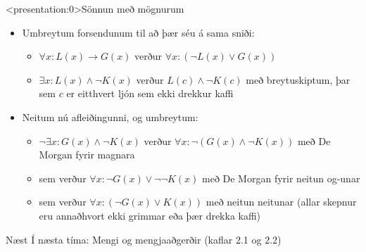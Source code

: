 \documentclass{beamer}
\begin{document}
\begin{frame}<presentation:0>{Sönnun með mögnurum}
\begin{itemize}
 \item Umbreytum forsendunum til að þær séu á sama sniði:
 \begin{itemize}
  \item $\forall x: L(x) \to G(x)$ verður $ \forall x:(\lnot L(x) \lor G(x))$
  \item $\exists x: L(x) \land \lnot K(x)$ verður $L(c) \land \lnot K(c)$ með breytuskiptum, þar sem $c$ er eitthvert ljón sem ekki drekkur kaffi
 \end{itemize}
 \item Neitum nú afleiðingunni, og umbreytum:
 \begin{itemize}
  \item $\lnot \exists x: G(x) \land \lnot K(x)$ verður $\forall x: \lnot (G(x) \land \lnot K(x))$ með De Morgan fyrir magnara
  \item sem verður $\forall x: \lnot G(x) \lor \lnot \lnot K(x)$ með De Morgan fyrir neitun og-unar
  \item sem verður $\forall x: (\lnot G(x) \lor K(x))$ með neitun neitunar (allar skepnur eru annaðhvort ekki grimmar eða þær drekka kaffi)
 \end{itemize}
\end{itemize}
\end{frame}

\begin{frame}{Næst}
Í næsta tíma: Mengi og mengjaaðgerðir (kaflar 2.1 og 2.2)
\end{frame}
\end{document}
